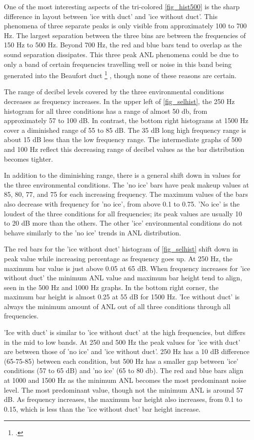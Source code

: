 
One of the most interesting aspects of the tri-colored \autoref{fig_hist500} is the sharp difference in layout between 'ice with duct' and 'ice without duct'. This phenomena of three separate peaks is only visible from approximately 100 to 700 Hz. The largest separation between the three bins are between the frequencies of 150 Hz to 500 Hz. Beyond 700 Hz, the red and blue bars tend to overlap as the sound separation dissipates. This three peak ANL phenomena could be due to only a band of certain frequencies travelling well or noise in this band being generated into the Beaufort duct \footcite{beaufortduct} , though none of these reasons are certain.

The range of decibel levels covered by the three environmental conditions decreases as frequency increases. In the upper left of \autoref{fig_selhist}, the 250 Hz histogram for all three conditions has a range of almost 50 db, from approximately 57 to 100 dB. In contrast, the bottom right histograms at 1500 Hz cover a diminished range of 55 to 85 dB. The 35 dB long high frequency range is about 15 dB less than the low frequency range. The intermediate graphs of 500 and 100 Hz reflect this decreasing range of decibel values as the bar distribution becomes tighter.

In addition to the diminishing range, there is a general shift down in values for the three environmental conditions. The 'no ice' bars have peak makeup values at 85, 80, 77, and 75 for each increasing frequency. The maximum values of the bars also decrease with frequency for 'no ice', from above 0.1 to 0.75. 'No ice' is the loudest of the three conditions for all frequencies; its peak values are usually 10 to 20 dB more than the others. The other 'ice' environmental conditions do not behave similarly to the 'no ice' trends in ANL distribution.

The red bars for the 'ice without duct' histogram of \autoref{fig_selhist} shift down in peak value while increasing percentage as frequency goes up. At 250 Hz, the maximum bar value is just above 0.05 at 65 dB. When frequency increases for 'ice without duct' the minimum ANL value and maximum bar height tend to align, seen in the 500 Hz and 1000 Hz graphs. In the bottom right corner, the maximum bar height is almost 0.25 at 55 dB for 1500 Hz. 'Ice without duct' is always the minimum amount of ANL out of all three conditions through all frequencies.

'Ice with duct' is similar to 'ice without duct' at the high frequencies, but differs in the mid to low bands. At 250 and 500 Hz the peak values for 'ice with duct' are between those of 'no ice' and 'ice without duct'. 250 Hz has a 10 dB difference (65-75-85) between each condition, but 500 Hz has a smaller gap between 'ice' conditions (57 to 65 dB) and 'no ice' (65 to 80 db). The red and blue bars align at 1000 and 1500 Hz as the minimum ANL becomes the most predominant noise level. The most predominant value, though not the minimum ANL is around 57 dB. As frequency increases, the maximum bar height also increases, from 0.1 to 0.15, which is less than the 'ice without duct' bar height increase.

